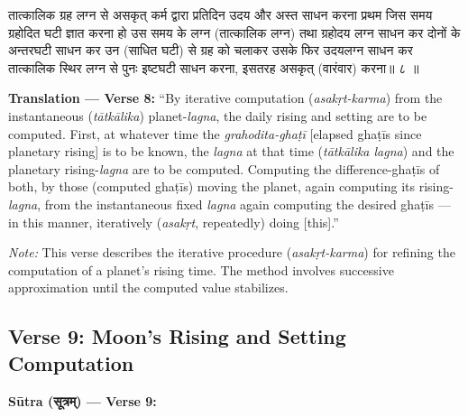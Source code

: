 \documentclass[11pt,a4paper]{article}
\newcommand{\dev}[1]{{\devanagarifont #1}}
\newenvironment{sanskritverse}{%
  \begin{center}\begin{minipage}{0.95\textwidth}
  \setlength{\leftskip}{1em}
  \setlength{\rightskip}{1em}
  \dev
}{\end{minipage}\end{center}}
\newenvironment{paracol}[1]{\begingroup}{\endgroup}
\newcommand{\switchcolumn}[1][]{%
  \ifnum#1=0\relax\else\par\nobreak\vspace{0.5em}\par\nobreak\fi%
}
\begin{document}
\begin{paracol}{2}

\begin{sanskritverse}
तात्कालिक ग्रह लग्न से असकृत् कर्म द्वारा प्रतिदिन उदय और अस्त साधन करना
प्रथम जिस समय ग्रहोदित घटी ज्ञात करना हो उस समय के लग्न (तात्कालिक लग्न)
तथा ग्रहोदय लग्न साधन कर दोनों के अन्तरघटी साधन कर उन (साधित घटी) से ग्रह
को चलाकर उसके फिर उदयलग्न साधन कर तात्कालिक स्थिर लग्न से पुनः इष्टघटी
साधन करना, इसतरह असकृत् (वारंवार) करना॥ ८ ॥
\end{sanskritverse}

\switchcolumn

\textbf{Translation — Verse 8:} ``By iterative computation (\textit{asakṛt-karma}) from the instantaneous (\textit{tātkālika}) planet-\textit{lagna}, the daily rising and setting are to be computed. First, at whatever time the \textit{grahodita-ghaṭī} [elapsed ghaṭīs since planetary rising] is to be known, the \textit{lagna} at that time (\textit{tātkālika lagna}) and the planetary rising-\textit{lagna} are to be computed. Computing the difference-ghaṭīs of both, by those (computed ghaṭīs) moving the planet, again computing its rising-\textit{lagna}, from the instantaneous fixed \textit{lagna} again computing the desired ghaṭīs --- in this manner, iteratively (\textit{asakṛt}, repeatedly) doing [this].''

\textit{Note:} This verse describes the iterative procedure (\textit{asakṛt-karma}) for refining the computation of a planet's rising time. The method involves successive approximation until the computed value stabilizes.

\end{paracol}

\subsection{Verse 9: Moon's Rising and Setting Computation}

\vspace{0.5em}
\noindent\textbf{Sūtra (\dev{सूत्रम्}) — Verse 9:}
\end{document}
